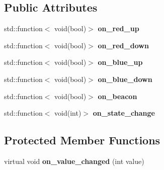 \subsection*{Public Attributes}
\begin{DoxyCompactItemize}
\item 
\mbox{\label{classev3dev_1_1remote__control_a1b0f3b54fbfc002de865581deb1b618b}} 
std\+::function$<$ void(bool)$>$ {\bfseries on\+\_\+red\+\_\+up}
\item 
\mbox{\label{classev3dev_1_1remote__control_aa769bba6d94b45dfe7d1c592c4016803}} 
std\+::function$<$ void(bool)$>$ {\bfseries on\+\_\+red\+\_\+down}
\item 
\mbox{\label{classev3dev_1_1remote__control_ab6ad97ee11336002e1f3b67ad9cabda7}} 
std\+::function$<$ void(bool)$>$ {\bfseries on\+\_\+blue\+\_\+up}
\item 
\mbox{\label{classev3dev_1_1remote__control_a590689b1b6e1ed6f1115dcec0d4c8f3f}} 
std\+::function$<$ void(bool)$>$ {\bfseries on\+\_\+blue\+\_\+down}
\item 
\mbox{\label{classev3dev_1_1remote__control_a107ef0c858d7ce7eaa39806611d1afa2}} 
std\+::function$<$ void(bool)$>$ {\bfseries on\+\_\+beacon}
\item 
\mbox{\label{classev3dev_1_1remote__control_a7cee358ad301fbbcc5853525d1abd1d1}} 
std\+::function$<$ void(int)$>$ {\bfseries on\+\_\+state\+\_\+change}
\end{DoxyCompactItemize}
\subsection*{Protected Member Functions}
\begin{DoxyCompactItemize}
\item 
\mbox{\label{classev3dev_1_1remote__control_ab698f0264b3ea115867d4e580d916bff}} 
virtual void {\bfseries on\+\_\+value\+\_\+changed} (int value)
\end{DoxyCompactItemize}
